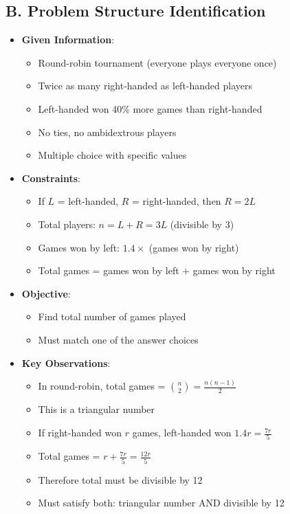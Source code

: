 \documentclass[12pt]{article}
\begin{document}
\begin{problemconfigbox}
\subsection*{B. Problem Structure Identification}
\begin{itemize}[leftmargin=*]
    \item \textbf{Given Information}: 
    \begin{itemize}
        \item Round-robin tournament (everyone plays everyone once)
        \item Twice as many right-handed as left-handed players
        \item Left-handed won 40\% more games than right-handed
        \item No ties, no ambidextrous players
        \item Multiple choice with specific values
    \end{itemize}
    \item \textbf{Constraints}: 
    \begin{itemize}
        \item If $L$ = left-handed, $R$ = right-handed, then $R = 2L$
        \item Total players: $n = L + R = 3L$ (divisible by 3)
        \item Games won by left: $1.4 \times$ (games won by right)
        \item Total games = games won by left + games won by right
    \end{itemize}
    \item \textbf{Objective}: 
    \begin{itemize}
        \item Find total number of games played
        \item Must match one of the answer choices
    \end{itemize}
    \item \textbf{Key Observations}: 
    \begin{itemize}
        \item In round-robin, total games = $\binom{n}{2} = \frac{n(n-1)}{2}$
        \item This is a triangular number
        \item If right-handed won $r$ games, left-handed won $1.4r = \frac{7r}{5}$
        \item Total games = $r + \frac{7r}{5} = \frac{12r}{5}$
        \item Therefore total must be divisible by 12
        \item Must satisfy both: triangular number AND divisible by 12
    \end{itemize}
\end{itemize}


\end{problemconfigbox}
\end{document}
